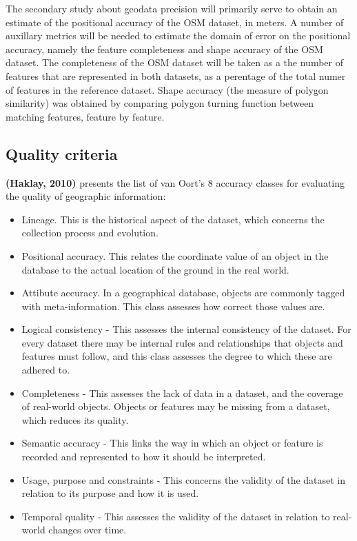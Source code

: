 \documentclass{kththesis}
\begin{document}
The secondary study about geodata precision will primarily serve to obtain an estimate of the positional accuracy of the OSM dataset, in meters.
A number of auxillary metrics will be needed to estimate the domain of error on the positional accuracy, namely the feature completeness and shape accuracy of the OSM dataset.
The completeness of the OSM dataset will be taken as a the number of features that are represented in both datasets, as a perentage of the total numer of features in the reference dataset.
Shape accuracy (the measure of polygon similarity) was obtained by comparing polygon turning function between matching features, feature by feature.

\subsection{Quality criteria}

\textbf{(Haklay, 2010)} presents the list of van Oort's 8 accuracy classes for evaluating the quality of geographic information:

\begin{itemize}
  \item Lineage. This is the historical aspect of the dataset, which concerns the collection process and evolution.
  \item Positional accuracy. This relates the coordinate value of an object in the database to the actual location of the ground in the real world.
  \item Attibute accuracy. In a geographical database, objects are commonly tagged with meta-information. This class assesses how correct those values are.
  \item Logical consistency - This assesses the internal consistency of the dataset. For every dataset there may be internal rules and relationships that objects and features must follow, and this class assesses the degree to which these are adhered to.
  \item Completeness - This assesses the lack of data in a dataset, and the coverage of real-world objects. Objects or features may be missing from a dataset, which reduces its quality.
  \item Semantic accuracy - This links the way in which an object or feature is recorded and represented to how it should be interpreted.
  \item Usage, purpose and constraints - This concerns the validity of the dataset in relation to its purpose and how it is used.
  \item Temporal quality - This assesses the validity of the dataset in relation to real-world changes over time.
\end{itemize}
\end{document}
